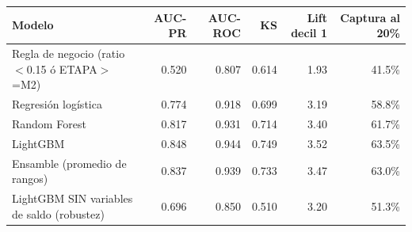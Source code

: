 \begin{tabular}{@{}lrrrrr@{}}
\toprule
\textbf{Modelo} & \textbf{AUC-PR} & \textbf{AUC-ROC} & \textbf{KS} & \textbf{Lift decil 1} & \textbf{Captura al 20\%} \\
\midrule
Regla de negocio (ratio$<$0.15 ó ETAPA$>$=M2) & 0.520 & 0.807 & 0.614 & 1.93 & 41.5\% \\
Regresión logística & 0.774 & 0.918 & 0.699 & 3.19 & 58.8\% \\
Random Forest & 0.817 & 0.931 & 0.714 & 3.40 & 61.7\% \\
LightGBM & 0.848 & 0.944 & 0.749 & 3.52 & 63.5\% \\
Ensamble (promedio de rangos) & 0.837 & 0.939 & 0.733 & 3.47 & 63.0\% \\
LightGBM SIN variables de saldo (robustez) & 0.696 & 0.850 & 0.510 & 3.20 & 51.3\% \\
\bottomrule
\end{tabular}